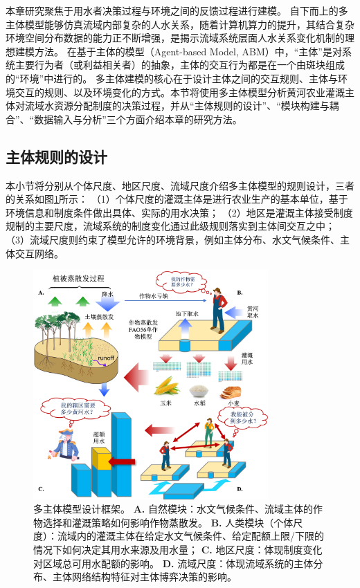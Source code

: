 本章研究聚焦于用水者决策过程与环境之间的反馈过程进行建模。
自下而上的多主体模型能够仿真流域内部复杂的人水关系，随着计算机算力的提升，其结合复杂环境空间分布数据的能力正不断增强，是揭示流域系统层面人水关系变化机制的理想建模方法。
在基于主体的模型（Agent-based Model, ABM）中，“主体”是对系统主要行为者（或利益相关者）的抽象，主体的交互行为都是在一个由斑块组成的“环境”中进行的。
多主体建模的核心在于设计主体之间的交互规则、主体与环境交互的规则、以及环境变化的方式。本节将使用多主体模型分析黄河农业灌溉主体对流域水资源分配制度的决策过程，并从“主体规则的设计”、“模块构建与耦合”、“数据输入与分析”三个方面介绍本章的研究方法。

\subsection{主体规则的设计}

本小节将分别从个体尺度、地区尺度、流域尺度介绍多主体模型的规则设计，三者的关系如图\ref{ch6:fig:framework}所示：
（1）个体尺度的灌溉主体是进行农业生产的基本单位，基于环境信息和制度条件做出具体、实际的用水决策；
（2）地区是灌溉主体接受制度规制的主要尺度，流域系统的制度变化通过此级规则落实到主体间交互之中；
（3）流域尺度则约束了模型允许的环境背景，例如主体分布、水文气候条件、主体交互网络。

\begin{figure}[htb]
    \centering
    \includegraphics[width=0.8\textwidth]{img/ch6/ch6_framework.png}
    \caption[多主体模型设计框架]{多主体模型设计框架。
        \textbf{A.} 自然模块：水文气候条件、流域主体的作物选择和灌溉策略如何影响作物蒸散发。
        \textbf{B.} 人类模块（个体尺度）：流域内的灌溉主体在给定水文气候条件、给定配额上限/下限的情况下如何决定其用水来源及用水量；
        \textbf{C.} 地区尺度：体现制度变化对区域总可用水配额的影响。
        \textbf{D.} 流域尺度：体现流域系统的主体分布、主体网络结构特征对主体博弈决策的影响。
    }\label{ch6:fig:framework}
\end{figure}

